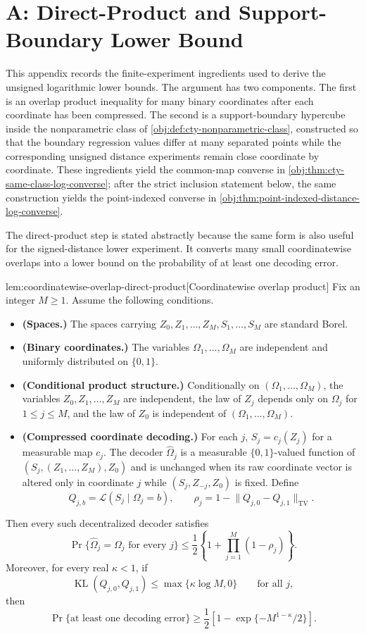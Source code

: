 \section{A: Direct-Product and Support-Boundary Lower Bound}
\label{sec:app-direct-product}

This appendix records the finite-experiment ingredients used to derive the unsigned logarithmic lower bounds. The argument has two components. The first is an overlap product inequality for many binary coordinates after each coordinate has been compressed. The second is a support-boundary hypercube inside the nonparametric class of \cref{obj:def:cty-nonparametric-class}, constructed so that the boundary regression values differ at many separated points while the corresponding unsigned distance experiments remain close coordinate by coordinate. These ingredients yield the common-map converse in \cref{obj:thm:cty-same-class-log-converse}; after the strict inclusion statement below, the same construction yields the point-indexed converse in \cref{obj:thm:point-indexed-distance-log-converse}.

The direct-product step is stated abstractly because the same form is also useful for the signed-distance lower experiment. It converts many small coordinatewise overlaps into a lower bound on the probability of at least one decoding error.

\begin{lemmav}{lem:coordinatewise-overlap-direct-product}[Coordinatewise overlap product]
Fix an integer \(M\geq 1\). Assume the following conditions.
\begin{itemize}
\item \textbf{(Spaces.)} The spaces carrying \(Z_0,Z_1,\ldots,Z_M,S_1,\ldots,S_M\) are standard Borel.
\item \textbf{(Binary coordinates.)} The variables \(\Omega_1,\ldots,\Omega_M\) are independent and uniformly distributed on \(\{0,1\}\).
\item \textbf{(Conditional product structure.)} Conditionally on \((\Omega_1,\ldots,\Omega_M)\), the variables \(Z_0,Z_1,\ldots,Z_M\) are independent, the law of \(Z_j\) depends only on \(\Omega_j\) for \(1\leq j\leq M\), and the law of \(Z_0\) is independent of \((\Omega_1,\ldots,\Omega_M)\).
\item \textbf{(Compressed coordinate decoding.)} For each \(j\), \(S_j=c_j(Z_j)\) for a measurable map \(c_j\). The decoder \(\widehat\Omega_j\) is a measurable \(\{0,1\}\)-valued function of \((S_j,(Z_1,\ldots,Z_M),Z_0)\) and is unchanged when its raw coordinate vector is altered only in coordinate \(j\) while \((S_j,Z_{-j},Z_0)\) is fixed. Define
\[
 Q_{j,b}=\mathcal L(S_j\mid\Omega_j=b),
 \qquad
 \rho_j=1-\lVert Q_{j,0}-Q_{j,1}\rVert_{\mathrm{TV}}.
\]
\end{itemize}
Then every such decentralized decoder satisfies
\[
 \Pr\{\widehat\Omega_j=\Omega_j\text{ for every }j\}
 \leq
 \frac12\left\{1+\prod_{j=1}^M(1-\rho_j)\right\}.
\]
Moreover, for every real \(\kappa<1\), if
\[
 \operatorname{KL}(Q_{j,0},Q_{j,1})\leq \max\{\kappa\log M,0\}
 \qquad\text{for all }j,
\]
then
\[
 \Pr\{\text{at least one decoding error}\}
 \geq
 \frac12\left[1-\exp\{-M^{1-\kappa}/2\}\right].
\]
\end{lemmav}

